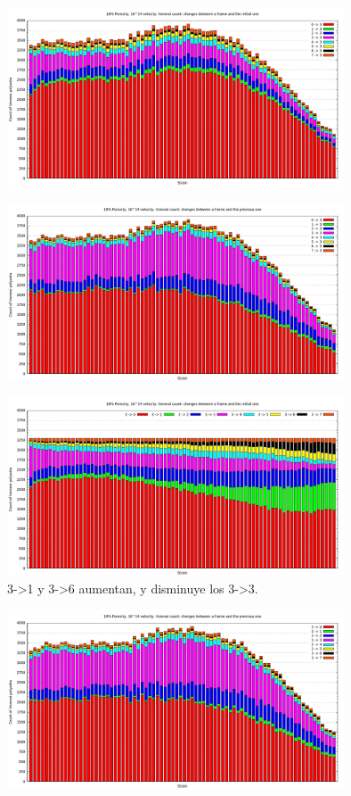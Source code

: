 \documentclass[10pt, oneside]{article} %
\begin{document}
\begin{figure}[H]
\centering
\includegraphics[width=10cm]{Figures/Porosidad/Porosidad_2vel_comp_voronoi_hist5.png}
\caption{}
\end{figure}

\begin{figure}[H]
\centering
\includegraphics[width=10cm]{Figures/Porosidad/Porosidad_2vel_comp_voronoi_hist6.png}
\caption{}
\end{figure}

\begin{figure}[H]
\centering
\includegraphics[width=10cm]{Figures/Porosidad/Porosidad_2vel_comp_voronoi_hist7.png}
\caption{3->1 y 3->6 aumentan, y disminuye los 3->3.}
\end{figure}

\begin{figure}[H]
\centering
\includegraphics[width=10cm]{Figures/Porosidad/Porosidad_2vel_comp_voronoi_hist8.png}
\caption{}
\label{fg:17comp}
\end{figure}
\end{document}
